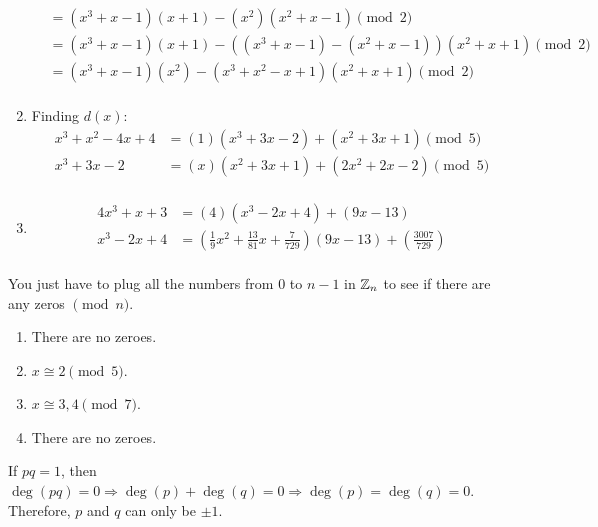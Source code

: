 \documentclass[12pt]{report}
\begin{document}
\begin{enumerate}[label=\alph*.]
\begin{align*}
        &= (x^3+x-1)(x+1) - (x^2)(x^2+x-1) \pmod{2} \\
        &= (x^3+x-1)(x+1) - ((x^3+x-1) -(x^2+x-1)) (x^2+x+1) \pmod{2} \\
        &= (x^3+x-1)(x^2) - (x^3+x^2-x+1)(x^2+x+1)\pmod{2} \\
    \end{align*}
    \item Finding $d(x)$:\begin{align*}
        x^3 + x^2 -4x + 4 &= (1)(x^3+3x-2)+(x^2+3x+1) \pmod{5} \\
        x^3 + 3x -2 &= (x)(x^2+3x+1) + (2x^2+2x-2) \pmod{5} \\
    \end{align*} 
    \item \begin{align*}
        4x^3 + x + 3 &= (4)(x^3 - 2 x + 4) + (9x-13) \\
        x^3 - 2 x + 4 &= \left(\frac{1}{9}x^2 + \frac{13}{81}x + \frac{7}{729}\right)(9x-13) + \left(\frac{3007}{729}\right) \\
    \end{align*} 
\end{enumerate}

\sol You just have to plug all the numbers from $0$ to $n-1$ in $\ZZ_n$ to see if there are any zeros $\pmod{n}$.
\begin{enumerate}[label=\alph*.]
    \item There are no zeroes.
    \item $x \cong 2 \pmod{5}$.
    \item $x \cong 3,4 \pmod{7}$.
    \item There are no zeroes.
\end{enumerate}

\sol If $pq = 1$, then $\operatorname{deg}(pq) = 0 \Rightarrow\operatorname{deg}(p) + \operatorname{deg}(q) = 0 \Rightarrow \operatorname{deg}(p) = \operatorname{deg}(q) = 0 $. Therefore, $p$ and $q$ can only be $\pm 1$. 
\end{document}
